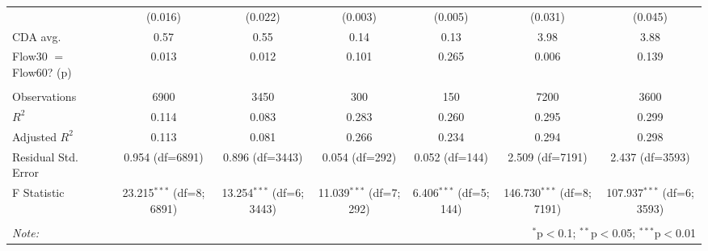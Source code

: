 \begin{table}[!htbp]
\begin{tabular}{@{\extracolsep{5pt}}lcccccc}
& (0.016) & (0.022) & (0.003) & (0.005) & (0.031) & (0.045) \\
 CDA avg. & 0.57 & 0.55 & 0.14 & 0.13 & 3.98 & 3.88 \\
 Flow30 $=$ Flow60? (p) & 0.013 & 0.012 & 0.101 & 0.265 & 0.006 & 0.139 \\
\hline \\[-1.8ex]
 Observations & 6900 & 3450 & 300 & 150 & 7200 & 3600 \\
 $R^2$ & 0.114 & 0.083 & 0.283 & 0.260 & 0.295 & 0.299 \\
 Adjusted $R^2$ & 0.113 & 0.081 & 0.266 & 0.234 & 0.294 & 0.298 \\
 Residual Std. Error & 0.954 (df=6891) & 0.896 (df=3443) & 0.054 (df=292) & 0.052 (df=144) & 2.509 (df=7191) & 2.437 (df=3593) \\
 F Statistic & 23.215$^{***}$ (df=8; 6891) & 13.254$^{***}$ (df=6; 3443) & 11.039$^{***}$ (df=7; 292) & 6.406$^{***}$ (df=5; 144) & 146.730$^{***}$ (df=8; 7191) & 107.937$^{***}$ (df=6; 3593) \\
\hline
\hline \\[-1.8ex]
\textit{Note:} & \multicolumn{6}{r}{$^{*}$p$<$0.1; $^{**}$p$<$0.05; $^{***}$p$<$0.01} \\
\end{tabular}
\end{table}